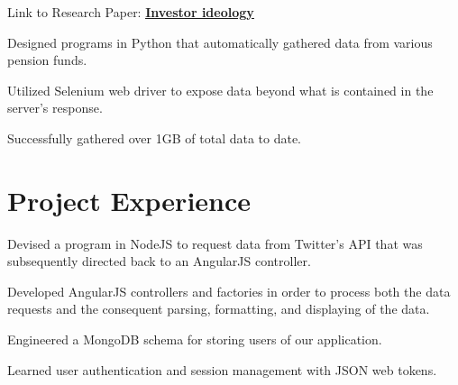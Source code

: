 \documentclass[letterpaper]{deedy-resume}
\begin{document}
\begin{minipage}[t]{0.66\textwidth}
\sectionspace
{}

Link to Research Paper: \href{https://www.sciencedirect.com/science/article/abs/pii/S0304405X20300635}{\underline{\textbf{Investor ideology}}}
\begin{tightitemize}
\item Designed programs in Python that automatically gathered data from various pension funds.
\vspace{3pt}
\item Utilized Selenium web driver to expose data beyond what is contained in the server's response.
\vspace{3pt}
\item Successfully gathered over 1GB of total data to date.

\end{tightitemize}
\section{Project Experience}
\begin{tightitemize}
\item Devised a program in NodeJS to request data from Twitter's API that was subsequently directed back to an AngularJS controller.
\item Developed AngularJS controllers and factories in order to process both the data requests and the consequent parsing, formatting, and displaying of the data.
\item Engineered a MongoDB schema for storing users of our application.
\item Learned user authentication and session management with JSON web tokens.
\end{tightitemize}
\sectionspace %
\end{minipage} %
\end{document}
